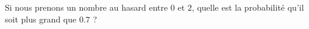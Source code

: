 
\begin{exercice}\label{exoPremiere-0078}

    Si nous prenons un nombre au hasard entre \( 0\) et \( 2\), quelle est la probabilité qu'il soit plus grand que \( 0.7\) ?

\end{exercice}
